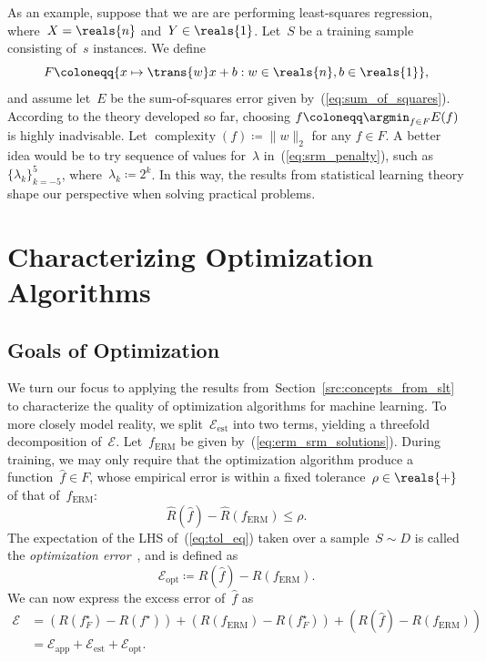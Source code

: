 \documentclass[11pt,a4paper]{article}
\numberwithin{equation}{section}
\newcommand{\complexity}{\operatorname{complexity}}
\newcommand{\apperr}{\mathcal{E}_{\mathrm{app}}}
\newcommand{\esterr}{\mathcal{E}_{\mathrm{est}}}
\newcommand{\opterr}{\mathcal{E}_{\mathrm{opt}}}
\begin{document}
As an example, suppose that we are are performing least-squares regression,
where~$X = \reals{n}$ and~$Y \in \reals{1}$. Let~$S$ be a training sample
consisting of~$s$ instances. We define
\[
	F \coloneqq \{ x \mapsto \trans{w}x + b : w \in \reals{n}, b \in
		\reals{1} \},
	\label{eq:affine_family}
\]
and assume let~$E$ be the sum-of-squares error given
by~(\ref{eq:sum_of_squares}). According to the theory developed so far, choosing
$f \coloneqq \argmin_{f \in F} E(f)$ is highly inadvisable. Let $\complexity(f)
\coloneqq \|w\|_2$ for any $f \in F$. A better idea would be to try sequence of
values for~$\lambda$ in~(\ref{eq:srm_penalty}), such as~$\{ \lambda_k \}_{k =
-5}^5$, where~$\lambda_k \coloneqq 2^k$. In this way, the results from
statistical learning theory shape our perspective when solving practical
problems.

\section{Characterizing Optimization Algorithms}
\label{sec:characterizing_opt}

\subsection{Goals of Optimization}

We turn our focus to applying the results
from~Section~\ref{src:concepts_from_slt} to characterize the quality of
optimization algorithms for machine learning. To more closely model reality, we
split~$\esterr$ into two terms, yielding a threefold decomposition
of~$\mathcal{E}$. Let~$f_{\text{ERM}}$ be given by~(\ref{eq:erm_srm_solutions}).
During training, we may only require that the optimization algorithm produce a
function~$\hat{f} \in F$, whose empirical error is within a fixed
tolerance~$\rho \in \reals{+}$ of that of~$f_{\text{ERM}}$:
\begin{equation}
	\hat{R}(\hat{f}) - \hat{R}(f_{\text{ERM}}) \leq \rho.
	\label{eq:tol_eq}
\end{equation}
The expectation of the LHS of~(\ref{eq:tol_eq}) taken over a sample~$S \sim D$
is called the \emph{optimization error}~\citep{bousquet2008tradeoffs}, and is
defined as
\[
	\opterr \coloneqq R(\hat{f}) - R(f_{\text{ERM}}).
\]
We can now express the excess error of~$\hat{f}$ as
\begin{align}
	\mathcal{E}
	&= (R(f_F^\star) - R(f^\star)) + (R(f_{\text{ERM}}) - R(f_F^\star)) +
		(R(\hat{f}) - R(f_{\text{ERM}})) \\
	&= \apperr + \esterr + \opterr.
	\label{eq:excess_error}
\end{align}
\end{document}
